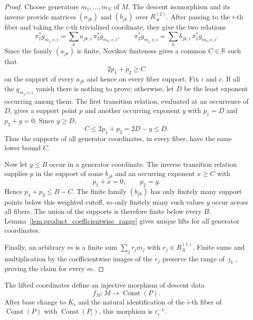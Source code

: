 \begin{proof}
  \leanok
  Choose generators $m_1,\ldots,m_N$ of $M$.  The descent isomorphism and its
  inverse provide matrices $(a_{jk})$ and $(b_{jk})$ over $R_A^{(2)}$.  After
  passing to the $i$-th fiber and taking the $c$-th trivialized coordinate,
  they give the two relations
  \[
    \pi_1^\ast g_{m_j,c,i}
      =\sum_k a_{jk,i}\,\pi_2^\ast g_{m_k,c,i},
    \qquad
    \pi_2^\ast g_{m_j,c,i}
      =\sum_k b_{jk,i}\,\pi_1^\ast g_{m_k,c,i}.
  \]
  Since the family $(a_{jk})$ is finite, Novikov finiteness gives a common
  $C\in\mathbb{R}$ such that
  \[
    2p_1+p_2\geq C
  \]
  on the support of every $a_{jk}$ and hence on every fiber support.  Fix $i$
  and $c$.  If all the $g_{m_j,c,i}$ vanish there is nothing to prove;
  otherwise, let $D$ be the least exponent occurring among them.  The first
  transition relation, evaluated at an occurrence of $D$, gives a support point
  $p$ and another occurring exponent
  $y$ with $p_1=D$ and $p_2+y=0$.  Since $y\geq D$,
  \[
    C\leq 2p_1+p_2=2D-y\leq D.
  \]
  Thus the supports of all generator coordinates, in every fiber, have the
  same lower bound $C$.

  Now let $y\leq B$ occur in a generator coordinate.  The inverse transition
  relation supplies $p$ in the support of some $b_{jk}$ and an occurring
  exponent $x\geq C$ with
  \[
    p_1+x=0,\qquad p_2=y.
  \]
  Hence $p_1+p_2\leq B-C$.  The finite family $(b_{jk})$ has only finitely many
  support points below this weighted cutoff, so only finitely many such values
  $y$ occur across all fibers.  The union of the supports is therefore finite
  below every $B$.  Lemma~\ref{lem:product_coefficientwise_range} gives unique
  lifts for all generator coordinates.

  Finally, an arbitrary $m$ is a finite sum $\sum_j r_jm_j$ with
  $r_j\in R_A^{(1)}$.  Finite sums and multiplication by the coefficientwise
  images of the $r_j$ preserve the range of $\jmath_1$, proving the claim for
  every $m$.
\end{proof}

\begin{lemma}
  \label{lem:product_to_constant}
  \leanok
  The lifted coordinates define an injective morphism of descent data
  \[
    f_M\colon M\longrightarrow\operatorname{Const}(P).
  \]
  After base change to $K_i$ and the natural identification of the $i$-th fiber
  of $\operatorname{Const}(P)$ with $\operatorname{Const}(P_i)$, this morphism
  is $\varepsilon_i^{-1}$.
\end{lemma}

